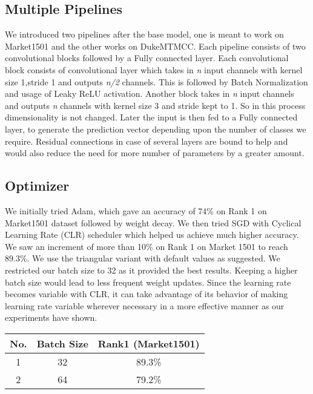 \documentclass[10pt,twocolumn,letterpaper]{article}
\begin{document}
\subsection{Multiple Pipelines}
We introduced two pipelines after the base model, one is meant to work on Market1501\cite{zheng2015scalable} and the other works on DukeMTMCC\cite{DBLP:journals/corr/abs-1712-09531}. Each pipeline consists of two convolutional blocks followed by a Fully connected layer. Each convolutional block consists of convolutional layer which takes in \textit{n} input channels with kernel size 1,stride 1 and outputs \textit{n/2} channels. This is followed by Batch Normalization\cite{DBLP:journals/corr/IoffeS15} and usage of Leaky ReLU\cite{DBLP:journals/corr/abs-1803-08375} activation. Another block takes in \textit{n} input channels and outputs \textit{n} channels with kernel size 3 and stride kept to 1. So in this process dimensionality is not changed. Later the input is then fed to a Fully connected layer, to generate the prediction vector depending upon the number of classes we require. Residual connections in case of several layers are bound to help and would also reduce the need for more number of parameters by a greater amount.




\subsection{Optimizer}
We initially tried Adam\cite{DBLP:journals/corr/KingmaB14}, which gave an accuracy of 74\% on Rank 1 on Market1501 dataset followed by weight decay. We then tried SGD with Cyclical Learning Rate (CLR)\cite{DBLP:journals/corr/Smith15a} scheduler which helped us achieve much higher accuracy. We saw an increment of more than 10\% on Rank 1 on Market 1501 to reach 89.3\%. We use the triangular variant with default values as suggested. We restricted our batch size to 32 as it provided the best results. Keeping a higher batch size would lead to less frequent weight updates. Since the learning rate becomes variable with CLR, it can take advantage of its behavior of making learning rate variable wherever necessary in a more effective manner as our experiments have shown. 

\begin{center}
 \begin{tabular}{||c c c ||} 
 \hline
 No. & Batch Size & Rank1 (Market1501) \\ [0.5ex] 
 \hline\hline
 1 & 32 & 89.3\% \\ 
 \hline
 2 & 64 & 79.2\% \\    [1ex] 
 \hline
\end{tabular}
\end{center}
\end{document}
